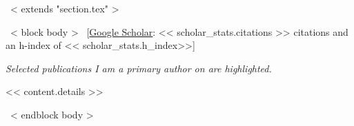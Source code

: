 ~< extends "section.tex" >~

~< block body >~
\vspace{-8.2mm}\hspace{30mm}[\href{https://scholar.google.com/citations?user=<< scholar_id >>}{Google Scholar}: << scholar_stats.citations >> citations and an h-index of << scholar_stats.h_index>>]\vspace{3mm}

\setlength\fboxsep{2pt}
\emph{Selected publications I am a primary author on are \hspace{-\fboxsep}\colorbox{tab_highlight}{highlighted.}}




<< content.details >>

~< endblock body >~
